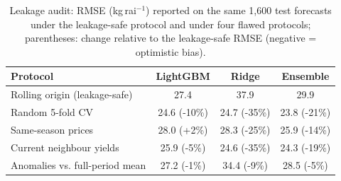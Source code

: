 \begin{table}[t]\centering\footnotesize
\caption{Leakage audit: RMSE (kg\,rai$^{-1}$) reported on the same 1{,}600 test forecasts under the leakage-safe protocol and under four flawed protocols; parentheses: change relative to the leakage-safe RMSE (negative = optimistic bias).}\label{tab:leakage}
\begin{tabular}{@{}lccc@{}}
\toprule
Protocol & LightGBM & Ridge & Ensemble \\
\midrule
Rolling origin (leakage-safe) & 27.4 & 37.9 & 29.9 \\
Random 5-fold CV & 24.6 (-10\%) & 24.7 (-35\%) & 23.8 (-21\%) \\
Same-season prices & 28.0 (+2\%) & 28.3 (-25\%) & 25.9 (-14\%) \\
Current neighbour yields & 25.9 (-5\%) & 24.6 (-35\%) & 24.3 (-19\%) \\
Anomalies vs. full-period mean & 27.2 (-1\%) & 34.4 (-9\%) & 28.5 (-5\%) \\
\bottomrule
\end{tabular}
\end{table}